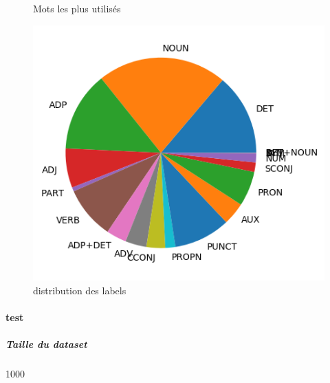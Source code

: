 \begin{figure}[H]
\begin{minipage}{0.48\textwidth}
\begin{tabular}{|l || *{11 }{|c} |}
\end{tabular}
\caption{ Mots les plus utilisés } \label{Fig:muw}\end{minipage} 
\begin{minipage}{0.48\textwidth} \centering
\label{Fig:pudtrain_img.png}
\caption{distribution des labels}\includegraphics[width=.7\linewidth]{pudtrain_img.png}

\end{minipage}
\end{figure}\paragraph{test}
\subparagraph{Taille du dataset}1000
